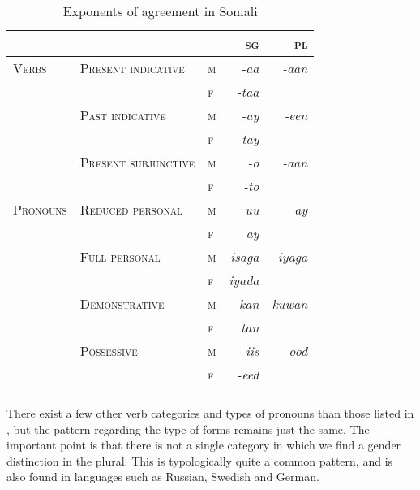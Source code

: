 \documentclass[output=paper]{langsci/langscibook}
\begin{document}
\begin{table}
\caption{Exponents of agreement in Somali}
\label{tab:nilsson:5}

\begin{tabularx}{\textwidth}{lp{4cm}Xrr}
\lsptoprule
 &  &  & \parbox{2cm}{\centering \textsc{sg}} & \parbox{2cm}{\centering \textsc{pl}}\\
\midrule
{\textsc{Verbs}} & {\textsc{Present indicative}} & {\textsc{m}} & {\textit{-aa}} & {\textit{-aan}}\\
\hhline{~~~~-} &  & {\textsc{f}} & {\textit{-taa}} & \\
\hhline{~----} & {\textsc{Past indicative}} & {\textsc{m}} & {\textit{-ay}} & {\textit{-een}}\\
\hhline{~~~~-} &  & {\textsc{f}} & {\textit{-tay}} & \\
\hhline{~----} & {\textsc{Present subjunctive}} & {\textsc{m}} & {\textit{-o}} & {\textit{-aan}}\\
\hhline{~~~~-} &  & {\textsc{f}} & {\textit{-to}} & \\
{\textsc{Pronouns}} & {\textsc{Reduced personal}} & {\textsc{m}} & {\textit{uu}} & {\textit{ay}}\\
\hhline{~~~~-} &  & {\textsc{f}} & {\textit{ay}} & \\
\hhline{~----} & {\textsc{Full personal}} & {\textsc{m}} & {\textit{isaga}} & {\textit{iyaga}}\\
\hhline{~~~~-} &  & {\textsc{f}} & {\textit{iyada}} & \\
\hhline{~----} & {\textsc{Demonstrative}} & {\textsc{m}} & {\textit{kan}} & {\textit{kuwan}}\\
\hhline{~~~~-} &  & {\textsc{f}} & {\textit{tan}} & \\
\hhline{~----} & {\textsc{Possessive}} & {\textsc{m}} & {\textit{-iis}} & {\textit{-ood}}\\
\hhline{~~~~-} &  & {\textsc{f}} & {-\textit{eed}} & \\
\hhline{----~}
\lspbottomrule
\end{tabularx}

\end{table} 

There exist a few other verb categories and types of pronouns than those listed in , but the pattern regarding the type of forms remains just the same. The important point is that there is not a single category in which we find a gender distinction in the plural. This is typologically quite a common pattern, and is also found in languages such as Russian, Swedish and German.
\end{document}
